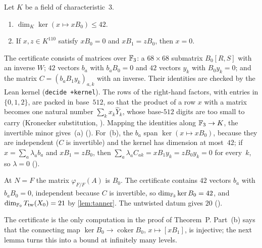 \begin{lemma}\label{lem:certificate}
Let $K$ be a field of characteristic~$3$.
\begin{enumerate}[label=(\alph*)]
\item $\dim_K\ker(x\mapsto xB_0)\le42$.
\item If $x,z\in K^{110}$ satisfy $xB_0=0$ and $xB_1=zB_0$, then $x=0$.
\end{enumerate}
\end{lemma}
\begin{outline}
The certificate consists of matrices over $\mathbb{F}_3$: a $68\times68$ submatrix $B_0[R,S]$ with an inverse $W$; $42$ vectors
$b_a$ with $b_aB_0=0$ and $42$ vectors $y_k$ with $B_0y_k=0$; and the matrix $C=(b_aB_1y_k)_{a,k}$ with an inverse. Their
identities are checked by the Lean kernel (\texttt{decide +kernel}). The rows of the right-hand factors, with entries in
$\{0,1,2\}$, are packed in base~$512$, so that the product of a row $x$ with a matrix becomes one natural number
$\sum_kx_k\hat Y_k$, whose base-$512$ digits are too small to carry (Kronecker substitution,
). Mapping the identities along $\mathbb{F}_3\to K$, the
invertible minor gives~(a) (). For~(b), the $b_a$ span
$\ker(x\mapsto xB_0)$, because they are independent ($C$ is invertible) and the kernel has dimension at most~$42$; if
$x=\sum_a\lambda_ab_a$ and $xB_1=zB_0$, then $\sum_a\lambda_aC_{ak}=xB_1y_k=zB_0y_k=0$ for every~$k$, so $\lambda=0$
().
\end{outline}

\begin{remark}[Numerical]\label{rem:base}
At $N=F$ the matrix $\varphi_{F/F}(A)$ is $B_0$. The certificate contains $42$ vectors $b_a$ with $b_aB_0=0$, independent
because $C$ is invertible, so $\dim_{\mathbb{F}_3}\ker B_0=42$, and $\dim_{\mathbb{F}_9}T_{\mathrm{tw}}(X_0)=21$ by \cref{lem:tanner}. The
untwisted datum gives $20$ ().
\end{remark}

The certificate is the only computation in the proof of Theorem~P. Part~(b) says that the connecting map
$\ker B_0\to\operatorname{coker}B_0$, $x\mapsto[xB_1]$, is injective; the next lemma turns this into a bound at
infinitely many levels.

